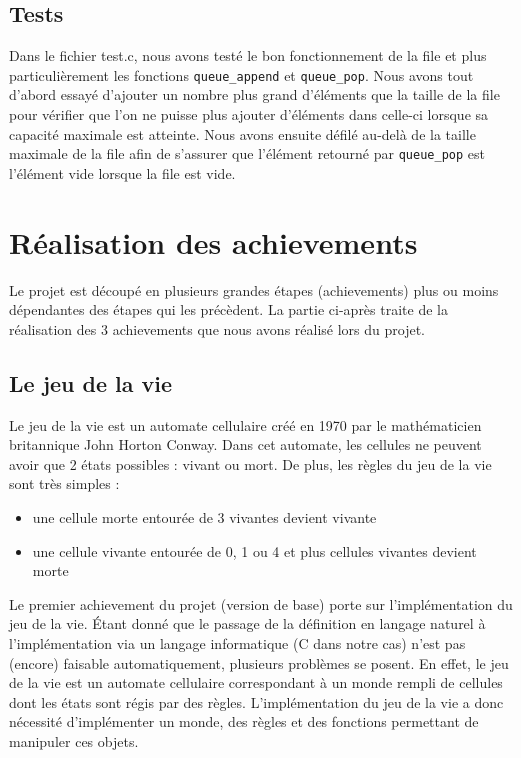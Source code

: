 \documentclass[a4paper]{article}
\begin{document}
\subsection{Tests}
Dans le fichier test.c, nous avons testé le bon fonctionnement de la file et plus particulièrement les fonctions \texttt{queue\_append} et \texttt{queue\_pop}. Nous avons tout d'abord essayé d'ajouter un nombre plus grand d'éléments que la taille de la file pour vérifier que l'on ne puisse plus ajouter d'éléments dans celle-ci lorsque sa capacité maximale est atteinte. Nous avons ensuite défilé au-delà de la taille maximale de la file afin de s'assurer que l'élément retourné par \texttt{queue\_pop} est l'élément vide lorsque la file est vide.

\newpage
\section{Réalisation des achievements}
Le projet est découpé en plusieurs grandes étapes (achievements) plus ou moins dépendantes des étapes qui les précèdent. La partie ci-après traite de la réalisation des 3 achievements que nous avons réalisé lors du projet.
\subsection{Le jeu de la vie} \label{sec:GOL}
Le jeu de la vie est un automate cellulaire créé en 1970 par le mathématicien britannique John Horton Conway. Dans cet automate, les cellules ne peuvent avoir que 2 états possibles : vivant ou mort. De plus, les règles du jeu de la vie sont très simples :
\begin{itemize}
    \item une cellule morte entourée de 3 vivantes devient vivante
    \item une cellule vivante entourée de 0, 1 ou 4 et plus cellules vivantes devient morte
\end{itemize}
Le premier achievement du projet (version de base) porte sur l'implémentation du jeu de la vie. Étant donné que le passage de la définition en langage naturel à l'implémentation via un langage informatique (C dans notre cas) n'est pas (encore) faisable automatiquement, plusieurs problèmes se posent. En effet, le jeu de la vie est un automate cellulaire correspondant à un monde rempli de cellules dont les états sont régis par des règles. L'implémentation du jeu de la vie a donc nécessité d'implémenter un monde, des règles et des fonctions permettant de manipuler ces objets.
\end{document}
